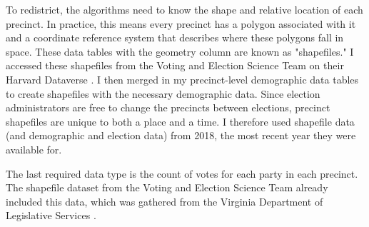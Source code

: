 To redistrict, the algorithms need to know the shape and relative location of each precinct. In practice, this means every precinct has a polygon associated with it and a coordinate reference system that describes where these polygons fall in space. These data tables with the geometry column are known as "shapefiles." I accessed these shapefiles from the Voting and Election Science Team on their Harvard Dataverse \parencite{votingandelectionscienceteam2019c}. I then merged in my precinct-level demographic data tables to create shapefiles with the necessary demographic data. Since election administrators are free to change the precincts between elections, precinct shapefiles are unique to both a place and a time. I therefore used shapefile data (and demographic and election data) from 2018, the most recent year they were available for.

The last required data type is the count of votes for each party in each precinct. The shapefile dataset from the Voting and Election Science Team already included this data, which was gathered from the Virginia Department of Legislative Services \parencite{votingandelectionscienceteam2019c}.